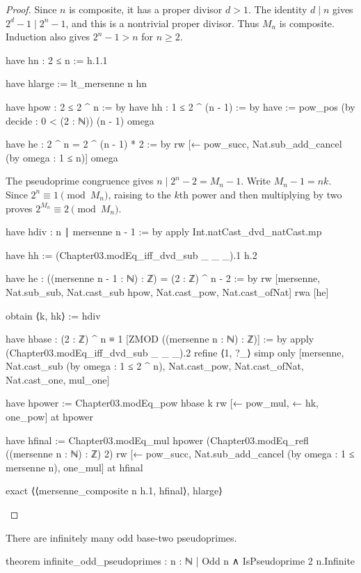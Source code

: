 \begin{proof}
  Since $n$ is composite, it has a proper divisor $d>1$.
  The identity $d\mid n$ gives $2^d-1\mid2^n-1$, and this is a nontrivial proper divisor.
  Thus $M_n$ is composite.
  Induction also gives $2^n-1>n$ for $n\ge2$.

  \begin{lean}
    have hn : 2 ≤ n := h.1.1

    have hlarge := lt_mersenne n hn

    have hpow : 2 ≤ 2 ^ n := by
      have hh : 1 ≤ 2 ^ (n - 1) := by
        have := pow_pos (by decide : 0 < (2 : ℕ)) (n - 1)
        omega

      have he : 2 ^ n = 2 ^ (n - 1) * 2 := by
        rw [← pow_succ, Nat.sub_add_cancel (by omega : 1 ≤ n)]
      omega
  \end{lean}

  The pseudoprime congruence gives $n\mid2^n-2=M_n-1$.
  Write $M_n-1=nk$.
  Since $2^n\equiv1\pmod{M_n}$, raising to the $k$th power and then multiplying by two proves
  $2^{M_n}\equiv2\pmod{M_n}$.

  \begin{lean}
    have hdiv : n ∣ mersenne n - 1 := by
      apply Int.natCast_dvd_natCast.mp

      have hh := (Chapter03.modEq_iff_dvd_sub _ _ _).1 h.2

      have he : ((mersenne n - 1 : ℕ) : ℤ) = (2 : ℤ) ^ n - 2 := by
        rw [mersenne, Nat.sub_sub, Nat.cast_sub hpow, Nat.cast_pow, Nat.cast_ofNat]
      rwa [he]

    obtain ⟨k, hk⟩ := hdiv

    have hbase : (2 : ℤ) ^ n ≡ 1 [ZMOD ((mersenne n : ℕ) : ℤ)] := by
      apply (Chapter03.modEq_iff_dvd_sub _ _ _).2
      refine ⟨1, ?_⟩
      simp only [mersenne, Nat.cast_sub (by omega : 1 ≤ 2 ^ n),
        Nat.cast_pow, Nat.cast_ofNat, Nat.cast_one, mul_one]

    have hpower := Chapter03.modEq_pow hbase k
    rw [← pow_mul, ← hk, one_pow] at hpower

    have hfinal := Chapter03.modEq_mul hpower
      (Chapter03.modEq_refl ((mersenne n : ℕ) : ℤ) 2)
    rw [← pow_succ, Nat.sub_add_cancel (by omega : 1 ≤ mersenne n), one_mul] at hfinal

    exact ⟨⟨mersenne_composite n h.1, hfinal⟩, hlarge⟩
  \end{lean}
\end{proof}

\begin{theorem}
  \label{ent:thm:infinite-odd-pseudoprimes}
  There are infinitely many odd base-two pseudoprimes.

  \begin{lean}
    theorem infinite_odd_pseudoprimes : {n : ℕ | Odd n ∧ IsPseudoprime 2 n}.Infinite
  \end{lean}
\end{theorem}

